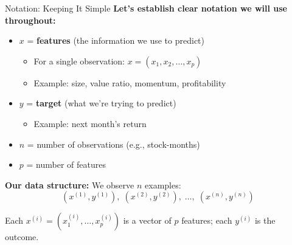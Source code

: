 \documentclass[10pt]{beamer}
\begin{document}
\begin{frame}{Notation: Keeping It Simple}
  \textbf{Let's establish clear notation we will use throughout:}
  
  \vspace{0.5em}
  \begin{itemize}
    \item $x$ = \textbf{features} (the information we use to predict)
    \begin{itemize}
      \item For a single observation: $x = (x_1, x_2, \ldots, x_p)$
      \item Example: size, value ratio, momentum, profitability
    \end{itemize}
    \vspace{0.3em}
    \item $y$ = \textbf{target} (what we're trying to predict)
    \begin{itemize}
      \item Example: next month's return
    \end{itemize}
    \vspace{0.3em}
    \item $n$ = number of observations (e.g., stock-months)
    \item $p$ = number of features
  \end{itemize}
  
  \vspace{1em}
  \textbf{Our data structure:} We observe $n$ examples:
  \[
  (x^{(1)}, y^{(1)}), \; (x^{(2)}, y^{(2)}), \; \ldots, \; (x^{(n)}, y^{(n)})
  \]
  
  \vspace{0.3em}
  Each $x^{(i)} = (x_1^{(i)}, \ldots, x_p^{(i)})$ is a vector of $p$ features; each $y^{(i)}$ is the outcome.
\end{frame}
\end{document}
